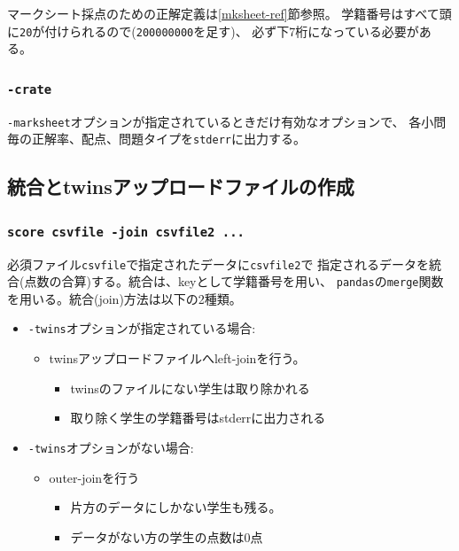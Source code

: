 マークシート採点のための正解定義は\ref{mksheet-ref}節参照。
学籍番号はすべて頭に\texttt{20}が付けられるので(\texttt{200000000}を足す)、
必ず下7桁になっている必要がある。

\subsubsection{\texttt{-crate}}
\label{-crate}

\texttt{-marksheet}オプションが指定されているときだけ有効なオプションで、
各小問毎の正解率、配点、問題タイプを\texttt{stderr}に出力する。

\subsection{統合とtwinsアップロードファイルの作成}
\label{統合とtwinsアップロードファイルの作成}

\subsubsection{\texttt{score csvfile -join csvfile2 ...}}
\label{scorecsvfile-joincsvfile2...}

必須ファイル\texttt{csvfile}で指定されたデータに\texttt{csvfile2}で
指定されるデータを統合(点数の合算)する。統合は、keyとして学籍番号を用い、
\texttt{pandas}の\texttt{merge}関数を用いる。統合(join)方法は以下の2種類。

\begin{itemize}
\item \texttt{-twins}オプションが指定されている場合:

\begin{itemize}
\item twinsアップロードファイルへleft-joinを行う。

\begin{itemize}
\item twinsのファイルにない学生は取り除かれる

\item 取り除く学生の学籍番号はstderrに出力される

\end{itemize}

\end{itemize}

\item \texttt{-twins}オプションがない場合:

\begin{itemize}
\item outer-joinを行う

\begin{itemize}
\item 片方のデータにしかない学生も残る。

\item データがない方の学生の点数は0点

\end{itemize}

\end{itemize}

\end{itemize}

